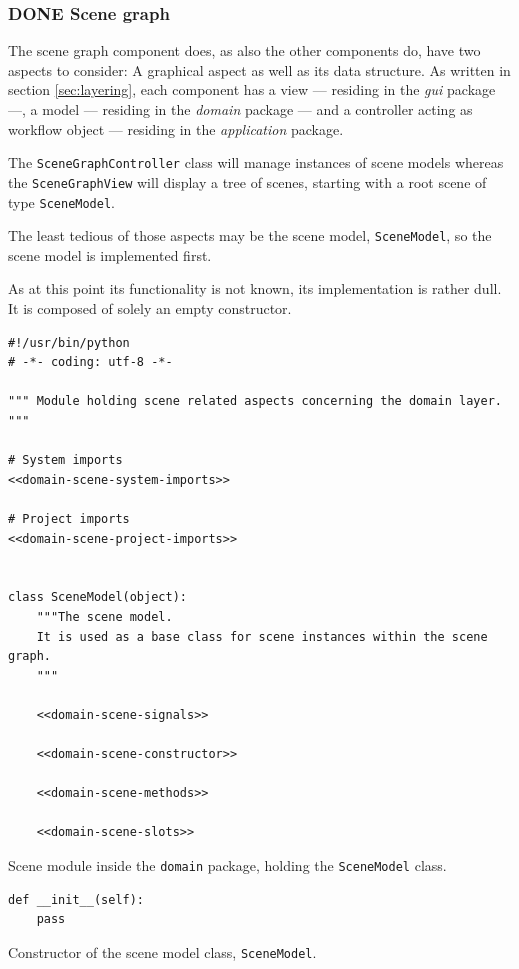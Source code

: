 \documentclass[10pt, openright, notitlepage]{scrreprt}
\begin{document}
\subsubsection{{\bfseries\sffamily DONE} Scene graph}
\label{sec:org0e05964}
The scene graph component does, as also the other components do, have two
aspects to consider: A graphical aspect as well as its data structure. As
written in section \ref{sec:layering}, each component has a view --- residing in the \emph{gui}
package ---, a model --- residing in the \emph{domain} package --- and a controller
acting as workflow object --- residing in the \emph{application} package.

The \texttt{SceneGraphController} class will manage instances of scene models
whereas the \texttt{SceneGraphView} will display a tree of scenes, starting
with a root scene of type \texttt{SceneModel}.

The least tedious of those aspects may be the scene model, \texttt{SceneModel}, so
the scene model is implemented first.

As at this point its functionality is not known, its implementation is rather
dull. It is composed of solely an empty constructor.

\begin{listing}[H]
\begin{verbatim}
#!/usr/bin/python
# -*- coding: utf-8 -*-

""" Module holding scene related aspects concerning the domain layer. """

# System imports
<<domain-scene-system-imports>>

# Project imports
<<domain-scene-project-imports>>


class SceneModel(object):
    """The scene model.
    It is used as a base class for scene instances within the scene graph.
    """

    <<domain-scene-signals>>

    <<domain-scene-constructor>>

    <<domain-scene-methods>>

    <<domain-scene-slots>>
\end{verbatim}
\caption{Scene module inside the \texttt{domain} package, holding the \texttt{SceneModel} class.}
\end{listing}

\begin{listing}[H]
\begin{verbatim}
def __init__(self):
    pass
\end{verbatim}
\caption{\label{domain-scene-constructor}
Constructor of the scene model class, \texttt{SceneModel}.}
\end{listing}
\end{document}
